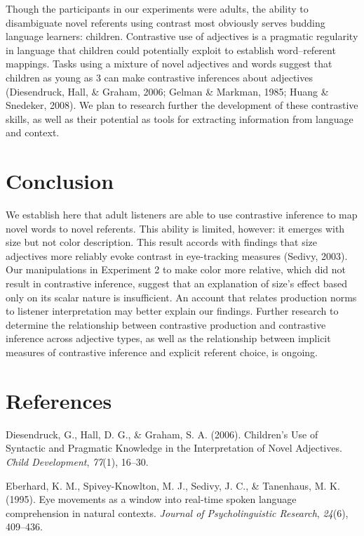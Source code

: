 \documentclass[10pt, letterpaper]{article}
\begin{document}
Though the participants in our experiments were adults, the ability to
disambiguate novel referents using contrast most obviously serves
budding language learners: children. Contrastive use of adjectives is a
pragmatic regularity in language that children could potentially exploit
to establish word--referent mappings. Tasks using a mixture of novel
adjectives and words suggest that children as young as 3 can make
contrastive inferences about adjectives (Diesendruck, Hall, \& Graham,
2006; Gelman \& Markman, 1985; Huang \& Snedeker, 2008). We plan to
research further the development of these contrastive skills, as well as
their potential as tools for extracting information from language and
context.

\section{Conclusion}\label{conclusion}

We establish here that adult listeners are able to use contrastive
inference to map novel words to novel referents. This ability is
limited, however: it emerges with size but not color description. This
result accords with findings that size adjectives more reliably evoke
contrast in eye-tracking measures (Sedivy, 2003). Our manipulations in
Experiment 2 to make color more relative, which did not result in
contrastive inference, suggest that an explanation of size's effect
based only on its scalar nature is insufficient. An account that relates
production norms to listener interpretation may better explain our
findings. Further research to determine the relationship between
contrastive production and contrastive inference across adjective types,
as well as the relationship between implicit measures of contrastive
inference and explicit referent choice, is ongoing.

\section*{References}\label{references}

\hypertarget{refs}{}
\hypertarget{ref-diesendruck_childrens_2006}{}
Diesendruck, G., Hall, D. G., \& Graham, S. A. (2006). Children's Use of
Syntactic and Pragmatic Knowledge in the Interpretation of Novel
Adjectives. \emph{Child Development}, \emph{77}(1), 16--30.

\hypertarget{ref-eberhard_eye_1995}{}
Eberhard, K. M., Spivey-Knowlton, M. J., Sedivy, J. C., \& Tanenhaus, M.
K. (1995). Eye movements as a window into real-time spoken language
comprehension in natural contexts. \emph{Journal of Psycholinguistic
Research}, \emph{24}(6), 409--436.
\end{document}
